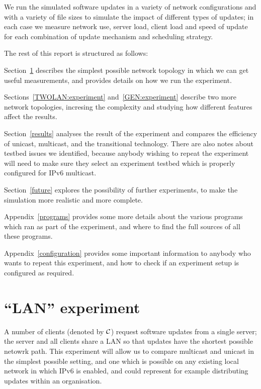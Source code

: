 \documentclass[a4paper,11pt,twocolumn]{article}
\begin{document}
We run the simulated software updates in a variety of network
configurations and with a variety of file sizes to simulate the
impact of different types of updates; in each case we measure network
use, server load, client load and speed of update for each combination
of update mechanism and scheduling strategy.

The rest of this report is structured as follows:

Section~\ref{LAN:experiment} describes the simplest possible network
topology in which we can get useful measurements, and provides details
on how we run the experiment.

Sections~\ref{TWOLAN:experiment} and~\ref{GEN:experiment} describe
two more network topologies, incresing the complexity and studying
how different features affect the results.

Section~\ref{results} analyses the result of the experiment and compares
the efficiency of unicast, multicast, and the transitional technology.
There are also notes about testbed issues we identified, because anybody
wishing to repeat the experiment will need to make sure they select
an experiment testbed which is properly configured for IPv6 multicast.

Section~\ref{future} explores the possibility of further experiments,
to make the simulation more realistic and more complete.

Appendix~\ref{programs} provides some more details about the various
programs which ran as part of the experiment, and where to find the
full sources of all these programs.

Appendix~\ref{configuration} provides some important information to
anybody who wants to repeat this experiment, and how to check if
an experiment setup is configured as required.

\section{``LAN'' experiment}
\label{LAN:experiment}

A number of clients (denoted by ${\cal C}$) request software updates
from a single server; the server and all clients share a LAN
so that updates have the shortest possible netowrk path.  This
experiment will allow us to compare multicast and unicast in the
simplest possible setting, and one which is possible on any existing
local network in which IPv6 is enabled, and could represent for example
distributing updates within an organisation.
\end{document}
